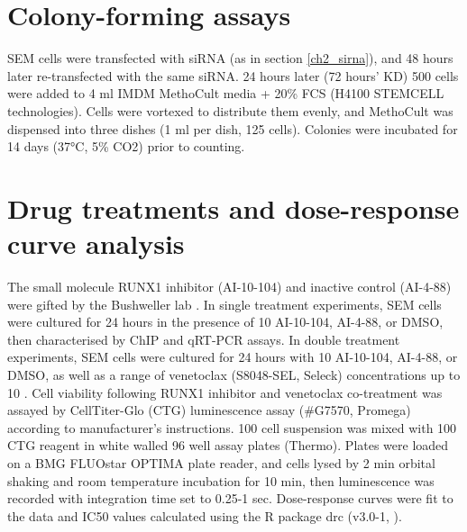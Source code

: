    \begin{table}[ht]
    \caption{Commercial siRNA used for perturbation experiments.}
    \label{tbl:ch2_sirna}
    \end{table}

\section{Colony-forming assays}

SEM cells were transfected with siRNA (as in section \ref{ch2_sirna}), and 48 hours later re-transfected with the same siRNA. 24 hours later (72 hours' KD) 500 cells were added to 4 ml IMDM MethoCult media + 20\% FCS (H4100 STEMCELL technologies). Cells were vortexed to distribute them evenly, and MethoCult was dispensed into three dishes (1 ml per dish, 125 cells). Colonies were incubated for 14 days (37°C, 5\% CO2) prior to counting.

\section{Drug treatments and dose-response curve analysis}

The small molecule RUNX1 inhibitor (AI-10-104) and inactive control (AI-4-88) were gifted by the Bushweller lab \citep{illendula_small-molecule_2015, illendula_small_2016}. In single treatment experiments, SEM cells were cultured for 24 hours in the presence of 10 \microm{} AI-10-104, AI-4-88, or DMSO, then characterised by ChIP and qRT-PCR assays. In double treatment experiments, SEM cells were cultured for 24 hours with 10 \microm{} AI-10-104, AI-4-88, or DMSO, as well as a range of venetoclax (S8048-SEL, Seleck) concentrations up to 10 \microm{}. Cell viability following RUNX1 inhibitor and venetoclax co-treatment was assayed by CellTiter-Glo (CTG) luminescence assay (\#G7570, Promega) according to manufacturer's instructions. 100 \microl{} cell suspension was mixed with 100 \microl{} CTG reagent in white walled 96 well assay plates (Thermo). Plates were loaded on a BMG FLUOstar OPTIMA plate reader, and cells lysed by 2 min orbital shaking and room temperature incubation for 10 min, then luminescence was recorded with integration time set to 0.25-1 sec. Dose-response curves were fit to the data and IC50 values calculated using the R package drc (v3.0-1, \cite{ritz_dose-response_2015}).

